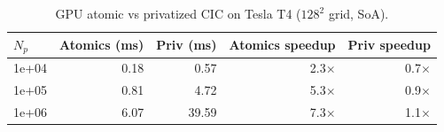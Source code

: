 \begin{table}[t]
\centering
\small
\caption{GPU atomic vs privatized CIC on Tesla T4 ($128^2$ grid, SoA).}
\label{tab:gpu_priv}
\begin{tabular}{lrrrr}
\toprule
$N_p$ & Atomics (ms) & Priv (ms) & Atomics speedup & Priv speedup \\
\midrule
1e+04 & 0.18 & 0.57 & 2.3$\times$ & 0.7$\times$ \\
1e+05 & 0.81 & 4.72 & 5.3$\times$ & 0.9$\times$ \\
1e+06 & 6.07 & 39.59 & 7.3$\times$ & 1.1$\times$ \\
\bottomrule
\end{tabular}
\end{table}
